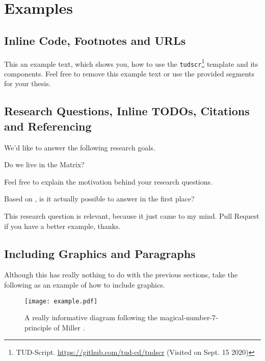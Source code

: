 \chapter{Examples}\label{ch:examples}


\section{Inline Code, Footnotes and URLs}

This an example text, which shows you, how to use the \texttt{tudscr}\footnote{TUD-Script. \url{https://github.com/tud-cd/tudscr} (Visited on Sept. 15 2020)} template and its components. Feel free to remove this example text or use the provided segments for your thesis.

\section{Research Questions, Inline TODOs, Citations and Referencing}


We'd like to answer the following research goals.

\begin{researchquestion}\label{rq:matrix}
Do we live in the Matrix?
\end{researchquestion}

\noindent Feel free to explain the motivation behind your research questions.

\begin{researchquestion}\label{rq:possible}
Based on \cite{gos_2020}, is it actually possible to answer  in the first place?
\end{researchquestion}

\noindent This research question is relevant, because it just came to my mind. Pull Request if you have a better example, thanks.

\section{Including Graphics and Paragraphs}

Although this has really nothing to do with the previous sections, take the following as an example of how to include graphics.

\begin{figure}[H]
\texttt{[image: example.pdf]}
\caption{A really informative diagram following the magical-number-7-principle of Miller \cite{magical_2020}.}\label{fig:example-single}
\end{figure}

